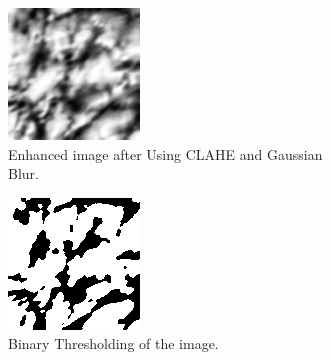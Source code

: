 \begin{enumerate}
    \begin{figure}[!ht]
        \centering
        \begin{subfigure}[t]{0.48\columnwidth}
            \includegraphics[width=\textwidth]{./images/preprocessing/enhanced_image.png}
            \caption{Enhanced image after Using CLAHE and Gaussian Blur.}
            \label{fig:enhanced_image}
        \end{subfigure}
        \hfill
        \begin{subfigure}[t]{0.48\columnwidth}
            \includegraphics[width=\textwidth]{./images/preprocessing/binarize_image.png}
            \caption{Binary Thresholding of the image.}
            \label{fig:binarize_image}
        \end{subfigure}
        \caption{}
    \end{figure}


\end{enumerate}
